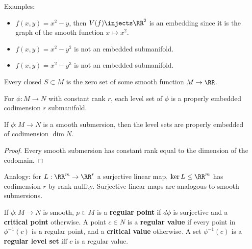 Examples:

\begin{itemize}
\tightlist
\item
  \(f(x, y) = x^2-y\), then \(V(f) \injects \RR^2\) is an embedding
  since it is the graph of the smooth function \(x\mapsto x^2\).
\item
  \(f(x, y) = x^2 - y^2\) is not an embedded submanifold.
\item
  \(f(x, y) = x^2 - y^3\) is not an embedded submanifold.
\end{itemize}

Every closed \(S\subset M\) is the zero set of some smooth function
\(M\to \RR\).

\begin{theorem}

For \(\phi: M\to N\) with constant rank \(r\), each level set of
\(\phi\) is a properly embedded codimension \(r\) submanifold.

\end{theorem}

\begin{corollary}

If \(\phi: M\to N\) is a smooth submersion, then the level sets are
properly embedded of codimension \(\dim N\).

\end{corollary}

\begin{proof}

Every smooth submersion has constant rank equal to the dimension of the
codomain.

\end{proof}

Analogy: for \(L:\RR^m\to \RR^r\) a surjective linear map,
\(\ker L \leq \RR^m\) has codimension \(r\) by rank-nullity. Surjective
linear maps are analogous to smooth submersions.

\begin{definition}

If \(\phi: M\to N\) is smooth, \(p\in M\) is a \textbf{regular point} if
\(d\phi\) is surjective and a \textbf{critical point} otherwise. A point
\(c\in N\) is a \textbf{regular value} if every point in
\(\phi^{-1}(c)\) is a regular point, and a \textbf{critical value}
otherwise. A set \(\phi^{-1}(c)\) is a \textbf{regular level set} iff
\(c\) is a regular value.

\end{definition}

